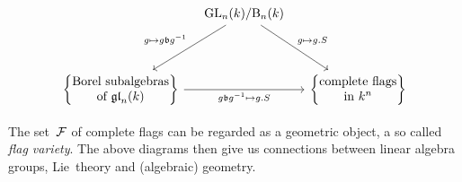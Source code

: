 \begin{remark}
\begin{enumerate}
      \[
        \begin{tikzcd}[column sep = small, row sep = huge]
          {}
          &
          \GL_n(k)/{\Borel_n(k)}
          \arrow{dl}[above left]{g \mapsto g \blie g^{-1}}
          \arrow{dr}[above right]{g \mapsto g.S}
          &
          {}
          \\
          \left\{
            \begin{tabular}{@{}c@{}}
              Borel~subalgebras \\
              of~$\gllie_n(k)$
            \end{tabular}
          \right\}
          \arrow{rr}[below]{g \blie g^{-1} \mapsto g.S}
          &
          {}
          &
          \left\{
            \begin{tabular}{@{}c@{}}
              complete flags \\
              in~$k^n$
            \end{tabular}
          \right\}
        \end{tikzcd}
      \]
  \end{enumerate}
  The set~$\mathcal{F}$ of complete flags can be regarded as a geometric object, a so called \emph{flag variety}.
  The above diagrams then give us connections between linear algebra groups, Lie~theory and (algebraic) geometry.
\end{remark}








